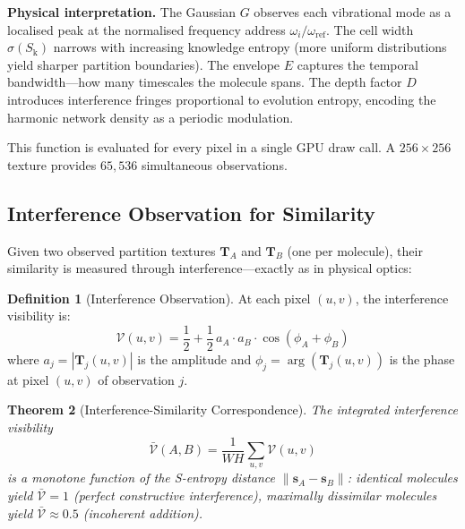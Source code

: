 \documentclass[11pt,twocolumn,a4paper]{article}
\newtheorem{theorem}{Theorem}[section]
\theoremstyle{definition}
\newtheorem{definition}[theorem]{Definition}
\theoremstyle{remark}
\newcommand{\Sk}{S_{\mathrm{k}}}
\begin{document}
\textbf{Physical interpretation.} The Gaussian $G$ observes each vibrational mode as a localised peak at the normalised frequency address $\omega_i/\omega_{\mathrm{ref}}$. The cell width $\sigma(\Sk)$ narrows with increasing knowledge entropy (more uniform distributions yield sharper partition boundaries). The envelope $E$ captures the temporal bandwidth---how many timescales the molecule spans. The depth factor $D$ introduces interference fringes proportional to evolution entropy, encoding the harmonic network density as a periodic modulation.

This function is evaluated for every pixel in a single GPU draw call. A $256 \times 256$ texture provides $65{,}536$ simultaneous observations.

\subsection{Interference Observation for Similarity}

Given two observed partition textures $\mathbf{T}_A$ and $\mathbf{T}_B$ (one per molecule), their similarity is measured through interference---exactly as in physical optics:

\begin{definition}[Interference Observation]
\label{def:interference}
At each pixel $(u,v)$, the interference visibility is:
\begin{equation}
\mathcal{V}(u,v) = \frac{1}{2} + \frac{1}{2}\, a_A \cdot a_B \cdot \cos(\phi_A + \phi_B)
\label{eq:visibility}
\end{equation}
where $a_j = |\mathbf{T}_j(u,v)|$ is the amplitude and $\phi_j = \arg(\mathbf{T}_j(u,v))$ is the phase at pixel $(u,v)$ of observation $j$.
\end{definition}

\begin{theorem}[Interference-Similarity Correspondence]
\label{thm:interference_similarity}
The integrated interference visibility
\begin{equation}
\bar{\mathcal{V}}(A, B) = \frac{1}{WH} \sum_{u,v} \mathcal{V}(u,v)
\label{eq:integrated_visibility}
\end{equation}
is a monotone function of the S-entropy distance $\|\mathbf{s}_A - \mathbf{s}_B\|$: identical molecules yield $\bar{\mathcal{V}} = 1$ (perfect constructive interference), maximally dissimilar molecules yield $\bar{\mathcal{V}} \approx 0.5$ (incoherent addition).
\end{theorem}
\end{document}
